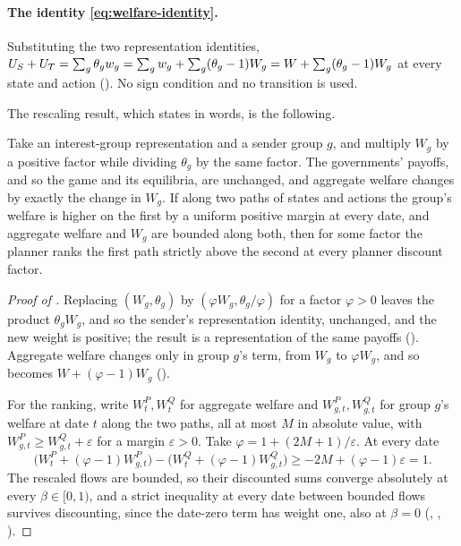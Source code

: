 \paragraph{The identity \eqref{eq:welfare-identity}.}
Substituting the two representation identities,
$U_S+U_T=\sum_g\theta_gw_g=\sum_gw_g+\sum_g(\theta_g-1)W_g=W+\sum_g(\theta_g-1)W_g$
at every state and action (). No sign condition and no
transition is used.

The rescaling result, which  states in words, is the
following.

\begin{proposition}
\label{prop:welfare-rescaling}
Take an interest-group representation and a sender group $g$, and multiply $W_g$
by a positive factor while dividing $\theta_g$ by the same factor. The governments'
payoffs, and so the game and its equilibria, are unchanged, and aggregate welfare
changes by exactly the change in $W_g$. If along two paths of states and
actions the group's welfare is higher on the first by a uniform positive margin at
every date, and aggregate welfare and $W_g$ are bounded along both, then for some
factor the planner ranks the first path strictly above the second at every
planner discount factor.
\end{proposition}

\begin{proof}[Proof of ]
Replacing $(W_g,\theta_g)$ by $(\varphi W_g,\theta_g/\varphi)$ for a factor $\varphi>0$ leaves the product
$\theta_gW_g$, and so the sender's representation identity, unchanged, and the new
weight is positive; the result is a representation of the same payoffs
(). Aggregate welfare changes only in group $g$'s term, from $W_g$ to
$\varphi W_g$, and so becomes $W+(\varphi-1)W_g$ ().

For the ranking, write $W^P_t,W^Q_t$ for aggregate welfare and $W^P_{g,t},W^Q_{g,t}$ for
group $g$'s welfare at date $t$ along the two paths, all at most $M$ in absolute
value, with $W^P_{g,t}\ge W^Q_{g,t}+\varepsilon$ for a margin $\varepsilon>0$. Take $\varphi=1+(2M+1)/\varepsilon$. At
every date
\[
\bigl(W^P_t+(\varphi-1)W^P_{g,t}\bigr)-\bigl(W^Q_t+(\varphi-1)W^Q_{g,t}\bigr)
\ge-2M+(\varphi-1)\varepsilon=1 .
\]
The rescaled flows are bounded, so their discounted sums converge absolutely at
every $\beta\in[0,1)$, and a strict inequality at every date between bounded flows
survives discounting, since the date-zero term has weight one, also at $\beta=0$
(, ,
).
\end{proof}

